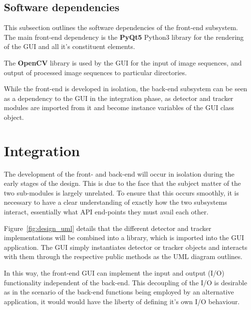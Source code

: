 \subsection{Software dependencies}
This subsection outlines the software dependencies of the front-end subsystem.
The main front-end dependency is the \textbf{PyQt5} Python3 library for the
rendering of the GUI and all it's constituent elements.

The \textbf{OpenCV} library is used by the GUI for the input of image sequences,
and output of processed image sequences to particular directories.

While the front-end is developed in isolation, the back-end subsystem can be
seen as a dependency to the GUI in the integration phase, as detector and
tracker modules are imported from it and become instance variables of the GUI
class object.

\section{Integration}
The development of the front- and back-end will occur in isolation during the
early stages of the design. This is due to the face that the subject matter of
the two sub-modules is largely unrelated. To ensure that this occurs smoothly,
it is necessary to have a clear understanding of exactly how the two subsystems
interact, essentially what API end-points they must avail each other.

Figure~\ref{fig:design_uml} details that the different detector and tracker
implementations will be combined into a library, which is imported into the GUI
application.
The GUI simply instantiates detector or tracker objects and interacts with them
through the respective public methods as the UML diagram outlines.

In this way, the front-end GUI can implement the input and output (I/O) functionality
independent of the back-end. This decoupling of the I/O is desirable as in the
scenario of the back-end functions being employed by an alternative application,
it would would have the liberty of defining it's own I/O behaviour. 



